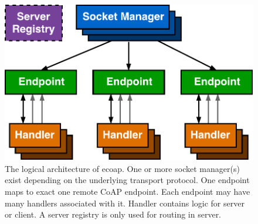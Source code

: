 \begin{figure}[!htbp]
\centering
\includegraphics[scale = 0.55]{ecoap_logic_arch}
\caption{The logical architecture of ecoap. One or more socket manager(s) exist depending on the underlying transport protocol. One endpoint maps to exact one remote CoAP endpoint. Each endpoint may have many handlers associated with it. Handler contains logic for server or client. A server registry is only used for routing in server.}
\label{fig:ecoap_arch_logic}
\end{figure}


